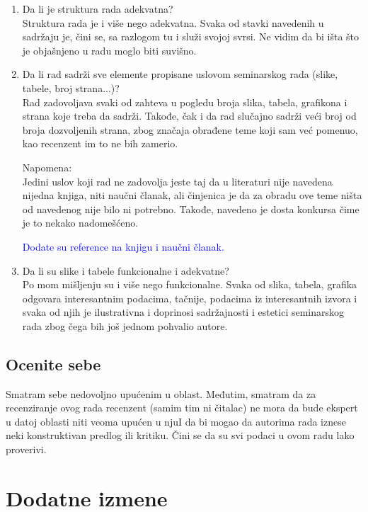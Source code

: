 \documentclass[a4paper]{report}
\newcommand{\odgovor}[1]{\textcolor{blue}{#1}}
\begin{document}
\begin{enumerate}
\item Da li je struktura rada adekvatna?\\

Struktura rada je i više nego adekvatna. Svaka od stavki navedenih u sadržaju je, čini se, sa razlogom tu i služi svojoj svrsi. Ne vidim da bi išta što je objašnjeno u radu moglo biti suvišno.

\item Da li rad sadrži sve elemente propisane uslovom seminarskog rada (slike, tabele, broj strana...)?\\

Rad zadovoljava svaki od zahteva u pogledu broja slika, tabela, grafikona i strana koje treba da sadrži. 
Takođe, čak i da rad slučajno sadrži veći broj od broja dozvoljenih strana, zbog značaja obrađene teme 
koji sam već pomenuo, kao recenzent im to ne bih zamerio. 

Napomena: \\
Jedini uslov koji rad ne zadovolja jeste taj da u literaturi nije navedena nijedna knjiga, niti naučni 
članak, ali činjenica je da za obradu ove teme ništa od navedenog nije bilo ni potrebno. Takođe, 
navedeno je dosta konkursa čime je to nekako nadomešćeno.

\odgovor{Dodate su reference na knjigu i naučni članak.}

\item Da li su slike i tabele funkcionalne i adekvatne?\\

Po mom mišljenju su i više nego funkcionalne. Svaka od slika, tabela, grafika odgovara interesantnim 
podacima, tačnije, podacima iz interesantnih izvora i svaka od njih je ilustrativna i doprinosi 
sadržajnosti i estetici seminarskog rada zbog čega bih još jednom pohvalio autore.

\end{enumerate}

\section{Ocenite sebe}
Smatram sebe nedovoljno upućenim u oblast. Međutim, smatram da za recenziranje ovog rada recenzent 
(samim tim ni čitalac) ne mora da bude ekspert u datoj oblasti niti veoma upućen u njuI da bi mogao da autorima 
rada iznese neki konstruktivan predlog ili kritiku. Čini se da su svi podaci u ovom radu lako proverivi.



\chapter{Dodatne izmene}
\end{document}
